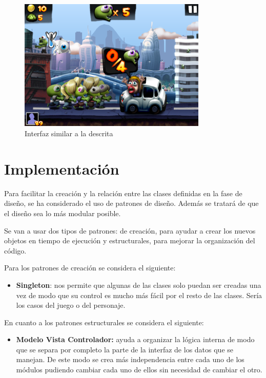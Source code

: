 \documentclass[palatino]{apuntes}
\begin{document}
\begin{figure}[hbtp]
    \centering
    \includegraphics[width=0.8\textwidth]{img/captura_zombies.png}
    \caption{Interfaz similar a la descrita}
    \label{fig:interfazzombie}
\end{figure}


\chapter{Implementación}
Para facilitar la creación y la relación entre las clases definidas en la fase de diseño, se ha considerado el uso de patrones de diseño. Además se tratará de que el diseño sea lo más modular posible.

Se van a usar dos tipos de patrones: de creación, para ayudar a crear los nuevos objetos en tiempo de ejecución y estructurales, para mejorar la organización del código.

Para los patrones de creación se considera el siguiente:
\begin{itemize}
	\item \textbf{Singleton}: nos permite que algunas de las clases solo puedan ser creadas una vez de modo que su control es mucho más fácil por el resto de las clases. Sería los casos del juego o del personaje.
\end{itemize}

En cuanto a los patrones estructurales se considera el siguiente:
\begin{itemize}
	\item \textbf{Modelo Vista Controlador:} ayuda a organizar la lógica interna de modo que se separa por completo la parte de la interfaz de los datos que se manejan. De este modo se crea más independencia entre cada uno de los módulos pudiendo cambiar cada uno de ellos sin necesidad de cambiar el otro.
\end{itemize}
\end{document}
